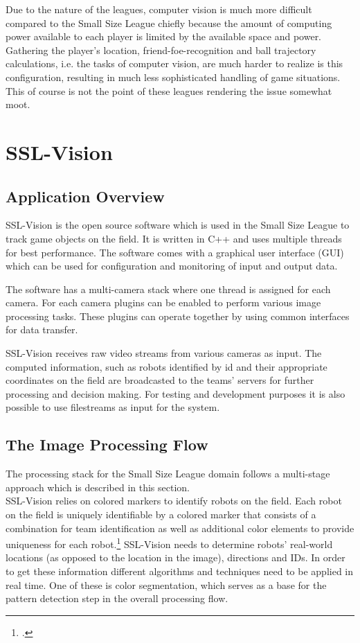 Due to the nature of the leagues, computer vision is much more difficult compared to the Small Size League chiefly because the amount of computing power available to each player is limited by the available space and power. Gathering the player's location, friend-foe-recognition and ball trajectory calculations, i.e. the tasks of computer vision, are much harder to realize is this configuration, resulting in much less sophisticated handling of game situations.
This of course is not the point of these leagues rendering the issue somewhat moot.

\newpage
\section{SSL-Vision \label{sec:ssl-vision}}


\subsection{Application Overview \label{sec:ssl-overview}}
SSL-Vision is the open source software which is used in the Small Size League to
track game objects on the field. It is written in C++ and uses multiple threads
for best performance. The software comes with a graphical user interface (GUI)
which can be used for configuration and monitoring of input and output data.

The software has a multi-camera stack where one thread is assigned for each camera.
For each camera plugins can be enabled to perform various image processing
tasks. These plugins can operate together by using common interfaces for data
transfer.

SSL-Vision receives raw video streams from various cameras as input. The
computed information, such as robots identified by id and their appropriate
coordinates on the field are broadcasted to the teams' servers for further
processing and decision making. For testing and development purposes it is also
possible to use filestreams as input for the system.

\subsection{The Image Processing Flow}
The processing stack for the Small Size League domain follows a multi-stage
approach which is described in this section.\\
SSL-Vision relies on colored markers to identify robots on the field.
Each robot on the field is uniquely identifiable by a colored marker that
consists of a combination for team identification as well as additional color
elements to provide uniqueness for each robot.\footcite[Cf.][5]{zickler_ssl_vision}
SSL-Vision needs to determine robots' real-world locations (as opposed to the
location in the image), directions and IDs.
In order to get these information different algorithms and techniques need to be
applied in real time. One of these is color segmentation, which serves as a 
base for the pattern detection step in the overall processing flow.


